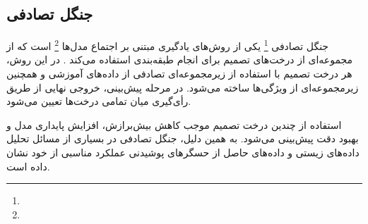 \subsection{جنگل تصادفی}

جنگل تصادفی
\footnote{}
یکی از روش‌های یادگیری مبتنی بر اجتماع مدل‌ها
\footnote{}
است که از مجموعه‌ای از درخت‌های تصمیم برای انجام طبقه‌بندی استفاده می‌کند \cite{Breiman2001RandomForest}. در این روش، هر درخت تصمیم با استفاده از زیرمجموعه‌ای تصادفی از داده‌های آموزشی و همچنین زیرمجموعه‌ای از ویژگی‌ها ساخته می‌شود. در مرحله پیش‌بینی، خروجی نهایی از طریق رأی‌گیری میان تمامی درخت‌ها تعیین می‌شود.

استفاده از چندین درخت تصمیم موجب کاهش بیش‌برازش، افزایش پایداری مدل و بهبود دقت پیش‌بینی می‌شود. به همین دلیل، جنگل تصادفی در بسیاری از مسائل تحلیل داده‌های زیستی و داده‌های حاصل از حسگرهای پوشیدنی عملکرد مناسبی از خود نشان داده است.
